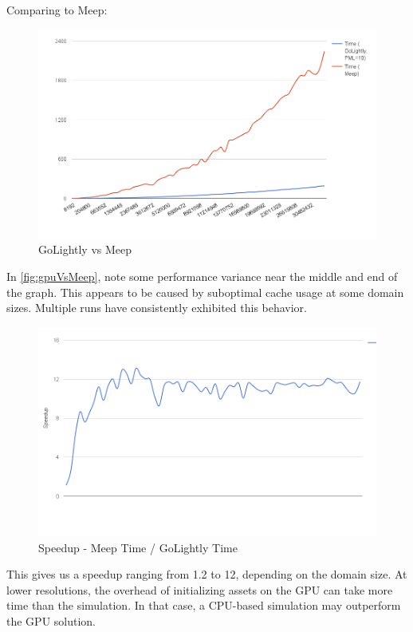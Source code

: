 Comparing to Meep:

\begin{figure}[H]
	\centering
	\includegraphics[width=\textwidth,
	keepaspectratio]{gpu-vs-meep.png}
	\caption{GoLightly vs Meep}
	\label{fig:gpuVsMeep}
\end{figure}

In \autoref{fig:gpuVsMeep}, note some performance variance near the middle and end of the graph. This appears to be caused by suboptimal cache usage at some domain sizes. Multiple runs have consistently exhibited this behavior.

\begin{figure}[H]
	\centering
	\includegraphics[width=\textwidth,
	keepaspectratio]{gpu-vs-meep-speedup.png}
	\caption{Speedup - Meep Time / GoLightly Time}
	\label{fig:gpuVsMeepSpeedup}
\end{figure}

This gives us a speedup ranging from 1.2 to 12, depending on the domain size. At lower resolutions, the overhead of initializing assets on the GPU can take more time than the simulation. In that case, a CPU-based simulation may outperform the GPU solution.

